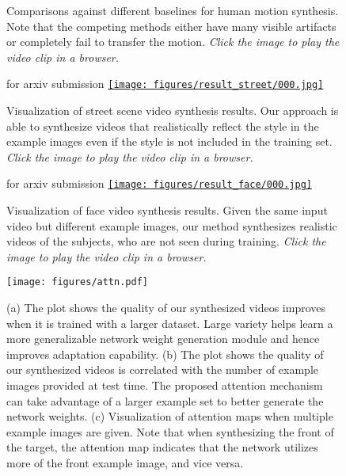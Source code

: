 \documentclass{article}
\def\arxiv{for arxiv submission}
\newcommand{\acrobat}{\emph{Click the image to play the video clip in a browser.}}
\newcommand{\acrobat}{\emph{The figure is best viewed with Acrobat Reader. Click the image to play the video clip.}}
\begin{document}
\begin{figure}[t!]
 \fi
  \caption{Comparisons against different baselines for human motion synthesis. Note that the competing methods either have many visible artifacts or completely fail to transfer the motion. \acrobat}
 \label{fig::comp_pose}
 \vspace{-4mm}
\end{figure} \begin{figure}[t!]
 \centering
 \ifdefined\arxiv
 \href{https://nvlabs.github.io/few-shot-vid2vid/web_gifs/street.gif}{\texttt{[image: figures/result\_street/000.jpg]}}
 \else
 \fi
  \caption{Visualization of street scene video synthesis results. Our approach is able to synthesize videos that realistically reflect the style in the example images even if the style is not included in the training set. \acrobat}
 \label{fig::result_street}
 \vspace{-4mm}
\end{figure} \begin{figure}[t!]
 \centering
 \ifdefined\arxiv
 \href{https://nvlabs.github.io/few-shot-vid2vid/web_gifs/face.gif}{\texttt{[image: figures/result\_face/000.jpg]}}
 \else
 \fi
  \caption{Visualization of face video synthesis results. Given the same input video but different example images, our method synthesizes realistic videos of the subjects, who are not seen during training. \acrobat}
 \label{fig::result_face}
\end{figure} \begin{figure}[t!]
 \centering
\texttt{[image: figures/attn.pdf]}
 \vspace{-3mm}
  \caption{(a) The plot shows the quality of our synthesized videos improves when it is trained with a larger dataset. Large variety helps learn a more generalizable network weight generation module and hence improves adaptation capability. (b) The plot shows the quality of our synthesized videos is correlated with the number of example images provided at test time. The proposed attention mechanism can take advantage of a larger example set to better generate the network weights. (c) Visualization of attention maps when multiple example images are given. Note that when synthesizing the front of the target, the attention map indicates that the network utilizes more of the front example image, and vice versa.}
  \vspace{-4mm}
 \label{fig::dataset}
\end{figure} 
\end{document}

